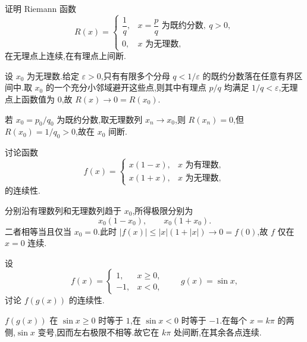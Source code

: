 \begin{example}[\markstar]
    证明 Riemann 函数
    \[
        R(x)=
        \begin{cases}
            \dfrac{1}{q}, & x=\dfrac{p}{q}\text{ 为既约分数},\ q>0, \\
            0,            & x\text{ 为无理数},
        \end{cases}
    \]
    在无理点上连续,在有理点上间断.
\end{example}
\exampleblank

\begin{solution}
    设 $x_0$ 为无理数.给定 $\varepsilon>0$,只有有限多个分母 $q<1/\varepsilon$ 的既约分数落在任意有界区间中.取 $x_0$ 的一个充分小邻域避开这些点,则其中有理点 $p/q$ 均满足 $1/q<\varepsilon$,无理点上函数值为 $0$,故 $R(x)\to0=R(x_0)$.

    若 $x_0=p_0/q_0$ 为既约分数,取无理数列 $x_n\to x_0$,则 $R(x_n)=0$,但 $R(x_0)=1/q_0>0$,故在 $x_0$ 间断.
\end{solution}

\begin{example}
    讨论函数
    \[
        f(x)=
        \begin{cases}
            x(1-x), & x\text{ 为有理数}, \\
            x(1+x), & x\text{ 为无理数},
        \end{cases}
    \]
    的连续性.
\end{example}
\exampleblank

\begin{solution}
    分别沿有理数列和无理数列趋于 $x_0$,所得极限分别为
    \[
        x_0(1-x_0),\qquad x_0(1+x_0).
    \]
    二者相等当且仅当 $x_0=0$.此时 $|f(x)|\leq |x|(1+|x|)\to0=f(0)$,故 $f$ 仅在 $x=0$ 连续.
\end{solution}

\begin{example}
    设
    \[
        f(x)=
        \begin{cases}
            1,  & x\geq0, \\
            -1, & x<0,
        \end{cases}
        \qquad g(x)=\sin x,
    \]
    讨论 $f(g(x))$ 的连续性.
\end{example}
\exampleblank

\begin{solution}
    $f(g(x))$ 在 $\sin x\geq0$ 时等于 $1$,在 $\sin x<0$ 时等于 $-1$.在每个 $x=k\pi$ 的两侧,$\sin x$ 变号,因而左右极限不相等.故它在 $k\pi$ 处间断,在其余各点连续.
\end{solution}

